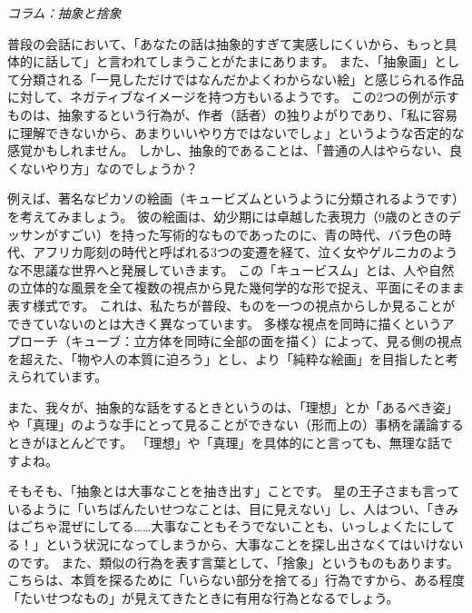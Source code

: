 \documentclass[uplatex,dvipdfmx,a4paper,11pt]{jsarticle}
\begin{document}
\begin{longartdeco}
	\begin{center}
	\emph{コラム：抽象と捨象}	
	\end{center}

	普段の会話において、「あなたの話は抽象的すぎて実感しにくいから、もっと具体的に話して」と言われてしまうことがたまにあります。
また、「抽象画」として分類される「一見しただけではなんだかよくわからない絵」と感じられる作品に対して、ネガティブなイメージを持つ方もいるようです。
この2つの例が示すものは、抽象するという行為が、作者（話者）の独りよがりであり、「私に容易に理解できないから、あまりいいやり方ではないでしょ」というような否定的な感覚かもしれません。
しかし、抽象的であることは、「普通の人はやらない、良くないやり方」なのでしょうか？

例えば、著名なピカソの絵画（キュービズムというように分類されるようです）を考えてみましょう。
彼の絵画は、幼少期には卓越した表現力（9歳のときのデッサンがすごい）を持った写術的なものであったのに、青の時代、バラ色の時代、アフリカ彫刻の時代と呼ばれる3つの変遷を経て、泣く女やゲルニカのような不思議な世界へと発展していきます。
この「キュービスム」とは、人や自然の立体的な風景を全て複数の視点から見た幾何学的な形で捉え、平面にそのまま表す様式です。
これは、私たちが普段、ものを一つの視点からしか見ることができていないのとは大きく異なっています。
多様な視点を同時に描くというアプローチ（キューブ：立方体を同時に全部の面を描く）によって、見る側の視点を超えた、「物や人の本質に迫ろう」とし、より「純粋な絵画」を目指したと考えられています。

また、我々が、抽象的な話をするときというのは、「理想」とか「あるべき姿」や「真理」のような手にとって見ることができない（形而上の）事柄を議論するときがほとんどです。
「理想」や「真理」を具体的にと言っても、無理な話ですよね。

そもそも、「抽象とは大事なことを抽き出す」ことです。
星の王子さまも言っているように「いちばんたいせつなことは、目に見えない」し、人はつい、「きみはごちゃ混ぜにしてる……大事なこともそうでないことも、いっしょくたにしてる！」という状況になってしまうから、大事なことを探し出さなくてはいけないのです。
また、類似の行為を表す言葉として、「捨象」というものもあります。
こちらは、本質を探るために「いらない部分を捨てる」行為ですから、ある程度「たいせつなもの」が見えてきたときに有用な行為となるでしょう。

\end{longartdeco}
\end{document}
